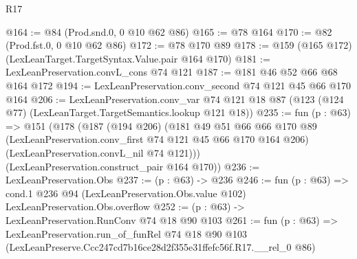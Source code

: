 \begin{lexlean}{R17}
\begin{coremodule}
@164 := @84 (Prod.snd.{0, 0} @10 @62 @86)
@165 := @78 @164
@170 := @82 (Prod.fst.{0, 0} @10 @62 @86)
@172 := @78 @170 @89
@178 := @159 (@165 @172) (LexLeanTarget.TargetSyntax.Value.pair @164 @170)
@181 := LexLeanPreservation.convL_cons @74 @121
@187 := @181 @46 @52 @66 @68 @164 @172
@194 := LexLeanPreservation.conv_second @74 @121 @45 @66 @170 @164
@206 := LexLeanPreservation.conv_var
    @74
    @121
    @18
    @87
    (@123 (@124 @77) (LexLeanTarget.TargetSemantics.lookup @121 @18))
@235 := fun (p : @63) =>
  @151
    (@178
      (@187
        (@194 @206)
        (@181
          @49
          @51
          @66
          @66
          @170
          @89
          (LexLeanPreservation.conv_first @74 @121 @45 @66 @170 @164 @206)
          (LexLeanPreservation.convL_nil @74 @121)))
      (LexLeanPreservation.construct_pair @164 @170))
@236 := LexLeanPreservation.Obs
@237 := (p : @63) -> @236
@246 := fun (p : @63) =>
  cond.{1} @236 @94 (LexLeanPreservation.Obs.value @102) LexLeanPreservation.Obs.overflow
@252 := (p : @63) -> LexLeanPreservation.RunConv @74 @18 @90 @103
@261 := fun (p : @63) =>
  LexLeanPreservation.run_of_funRel
    @74
    @18
    @90
    @103
    (LexLeanPreserve.Ccc247cd7b16ce28d2f355e31ffefc56f.R17.__rel_0 @86)
\end{coremodule}
\end{lexlean}
